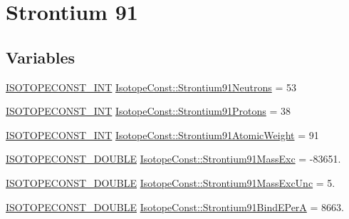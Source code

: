 \hypertarget{group___isotope_const-_strontium-_sr91}{}\section{Strontium 91}
\label{group___isotope_const-_strontium-_sr91}
\subsection*{Variables}
\begin{DoxyCompactItemize}
\item 
\mbox{\hyperlink{group___isotope_const-_macros_ga5f18360b3e99483a35c32d789e62621c}{I\+S\+O\+T\+O\+P\+E\+C\+O\+N\+S\+T\+\_\+\+I\+NT}} \mbox{\hyperlink{group___isotope_const-_strontium-_sr91_gae0e48b34336c1fe5d86330ff1707484a}{Isotope\+Const\+::\+Strontium91\+Neutrons}} = 53
\item 
\mbox{\hyperlink{group___isotope_const-_macros_ga5f18360b3e99483a35c32d789e62621c}{I\+S\+O\+T\+O\+P\+E\+C\+O\+N\+S\+T\+\_\+\+I\+NT}} \mbox{\hyperlink{group___isotope_const-_strontium-_sr91_ga4e834567211891ce46c9802caf5ebc6d}{Isotope\+Const\+::\+Strontium91\+Protons}} = 38
\item 
\mbox{\hyperlink{group___isotope_const-_macros_ga5f18360b3e99483a35c32d789e62621c}{I\+S\+O\+T\+O\+P\+E\+C\+O\+N\+S\+T\+\_\+\+I\+NT}} \mbox{\hyperlink{group___isotope_const-_strontium-_sr91_gab5fb0c108e20bdbd8780a68ee96915ca}{Isotope\+Const\+::\+Strontium91\+Atomic\+Weight}} = 91
\item 
\mbox{\hyperlink{group___isotope_const-_macros_ga8f45a7272ce02c0b4c65c44636ed719a}{I\+S\+O\+T\+O\+P\+E\+C\+O\+N\+S\+T\+\_\+\+D\+O\+U\+B\+LE}} \mbox{\hyperlink{group___isotope_const-_strontium-_sr91_ga07c49e6ad0ae4115ff9acf8577bd6b2b}{Isotope\+Const\+::\+Strontium91\+Mass\+Exc}} = -\/83651.
\item 
\mbox{\hyperlink{group___isotope_const-_macros_ga8f45a7272ce02c0b4c65c44636ed719a}{I\+S\+O\+T\+O\+P\+E\+C\+O\+N\+S\+T\+\_\+\+D\+O\+U\+B\+LE}} \mbox{\hyperlink{group___isotope_const-_strontium-_sr91_gaf6dd2af278f40c2cbaf12eb22115573f}{Isotope\+Const\+::\+Strontium91\+Mass\+Exc\+Unc}} = 5.
\item 
\mbox{\hyperlink{group___isotope_const-_macros_ga8f45a7272ce02c0b4c65c44636ed719a}{I\+S\+O\+T\+O\+P\+E\+C\+O\+N\+S\+T\+\_\+\+D\+O\+U\+B\+LE}} \mbox{\hyperlink{group___isotope_const-_strontium-_sr91_ga08364352afda3a32c1fdad71a2d9a85e}{Isotope\+Const\+::\+Strontium91\+Bind\+E\+PerA}} = 8663.
\item 

\end{DoxyCompactItemize}
